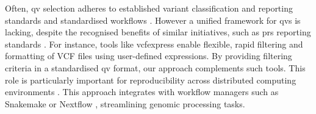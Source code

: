 Often, \ac{qv} selection adheres to established variant classification and reporting standards \cite{richards2015standards, li2017standards, li2017intervar, riggs2020technical, tavtigian2020fitting} and standardised workflows \cite{pedersen2021effective, anderson2010data, uffelmann2021genome}. 
However a unified framework for \ac{qv}s is lacking, despite the recognised benefits of similar initiatives, such as \ac{prs} reporting standards \cite{wand2021improving, lambert2021polygenic}.
For instance, tools like vcfexpress \cite{pedersen_vcfexpress_2025} enable flexible, rapid filtering and formatting of VCF files using user-defined expressions. By providing filtering criteria in a standardised \ac{qv} format, our approach complements such tools.
This role is particularly important for reproducibility across distributed computing environments \cite{bal_programming_1989}.
This approach integrates with workflow managers such as Snakemake \cite{molder_sustainable_2021} or Nextflow \cite{di_tommaso_nextflow_2017}, streamlining genomic processing tasks.

